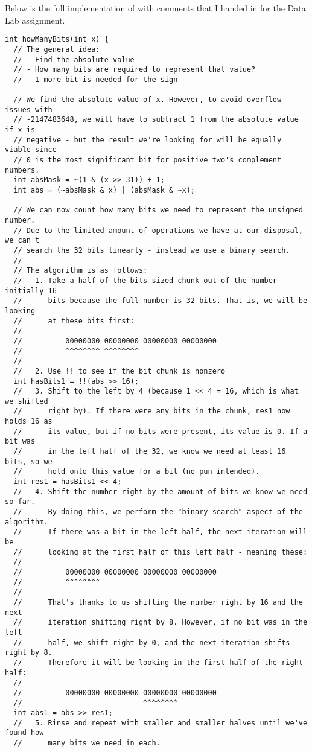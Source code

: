 Below is the full implementation of  with comments that I handed in for the Data Lab assignment.

\bgroup
\small
\begin{verbatim}
int howManyBits(int x) {
  // The general idea:
  // - Find the absolute value
  // - How many bits are required to represent that value?
  // - 1 more bit is needed for the sign

  // We find the absolute value of x. However, to avoid overflow issues with
  // -2147483648, we will have to subtract 1 from the absolute value if x is
  // negative - but the result we're looking for will be equally viable since
  // 0 is the most significant bit for positive two's complement numbers.
  int absMask = ~(1 & (x >> 31)) + 1;
  int abs = (~absMask & x) | (absMask & ~x);

  // We can now count how many bits we need to represent the unsigned number.
  // Due to the limited amount of operations we have at our disposal, we can't
  // search the 32 bits linearly - instead we use a binary search.
  //
  // The algorithm is as follows:
  //   1. Take a half-of-the-bits sized chunk out of the number - initially 16
  //      bits because the full number is 32 bits. That is, we will be looking
  //      at these bits first:
  //
  //          00000000 00000000 00000000 00000000
  //          ^^^^^^^^ ^^^^^^^^
  //
  //   2. Use !! to see if the bit chunk is nonzero
  int hasBits1 = !!(abs >> 16);
  //   3. Shift to the left by 4 (because 1 << 4 = 16, which is what we shifted
  //      right by). If there were any bits in the chunk, res1 now holds 16 as
  //      its value, but if no bits were present, its value is 0. If a bit was
  //      in the left half of the 32, we know we need at least 16 bits, so we
  //      hold onto this value for a bit (no pun intended).
  int res1 = hasBits1 << 4;
  //   4. Shift the number right by the amount of bits we know we need so far.
  //      By doing this, we perform the "binary search" aspect of the algorithm.
  //      If there was a bit in the left half, the next iteration will be
  //      looking at the first half of this left half - meaning these:
  //
  //          00000000 00000000 00000000 00000000
  //          ^^^^^^^^
  //
  //      That's thanks to us shifting the number right by 16 and the next
  //      iteration shifting right by 8. However, if no bit was in the left
  //      half, we shift right by 0, and the next iteration shifts right by 8.
  //      Therefore it will be looking in the first half of the right half:
  //
  //          00000000 00000000 00000000 00000000
  //                            ^^^^^^^^
  int abs1 = abs >> res1;
  //   5. Rinse and repeat with smaller and smaller halves until we've found how
  //      many bits we need in each.


\end{verbatim}
